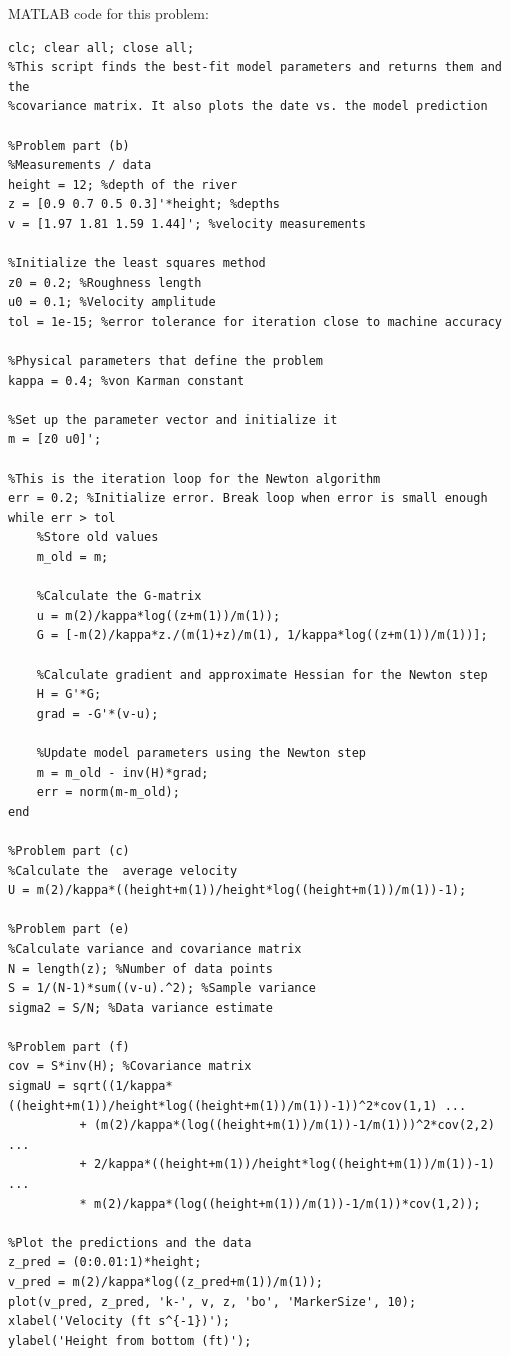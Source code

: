 \documentclass[11pt]{article}
\begin{document}
\vspace{1cm}
\noindent MATLAB code for this problem:
\begin{verbatim}
clc; clear all; close all;
%This script finds the best-fit model parameters and returns them and the
%covariance matrix. It also plots the date vs. the model prediction

%Problem part (b)
%Measurements / data
height = 12; %depth of the river
z = [0.9 0.7 0.5 0.3]'*height; %depths
v = [1.97 1.81 1.59 1.44]'; %velocity measurements

%Initialize the least squares method
z0 = 0.2; %Roughness length
u0 = 0.1; %Velocity amplitude
tol = 1e-15; %error tolerance for iteration close to machine accuracy

%Physical parameters that define the problem
kappa = 0.4; %von Karman constant

%Set up the parameter vector and initialize it
m = [z0 u0]';

%This is the iteration loop for the Newton algorithm
err = 0.2; %Initialize error. Break loop when error is small enough
while err > tol
    %Store old values
    m_old = m;
    
    %Calculate the G-matrix
    u = m(2)/kappa*log((z+m(1))/m(1));
    G = [-m(2)/kappa*z./(m(1)+z)/m(1), 1/kappa*log((z+m(1))/m(1))];
        
    %Calculate gradient and approximate Hessian for the Newton step
    H = G'*G;
    grad = -G'*(v-u);
    
    %Update model parameters using the Newton step
    m = m_old - inv(H)*grad;
    err = norm(m-m_old);
end

%Problem part (c)
%Calculate the  average velocity
U = m(2)/kappa*((height+m(1))/height*log((height+m(1))/m(1))-1);

%Problem part (e)
%Calculate variance and covariance matrix
N = length(z); %Number of data points
S = 1/(N-1)*sum((v-u).^2); %Sample variance
sigma2 = S/N; %Data variance estimate

%Problem part (f)
cov = S*inv(H); %Covariance matrix
sigmaU = sqrt((1/kappa*((height+m(1))/height*log((height+m(1))/m(1))-1))^2*cov(1,1) ...
          + (m(2)/kappa*(log((height+m(1))/m(1))-1/m(1)))^2*cov(2,2) ...
          + 2/kappa*((height+m(1))/height*log((height+m(1))/m(1))-1) ...
          * m(2)/kappa*(log((height+m(1))/m(1))-1/m(1))*cov(1,2));          

%Plot the predictions and the data
z_pred = (0:0.01:1)*height;
v_pred = m(2)/kappa*log((z_pred+m(1))/m(1));
plot(v_pred, z_pred, 'k-', v, z, 'bo', 'MarkerSize', 10);
xlabel('Velocity (ft s^{-1})');
ylabel('Height from bottom (ft)');
\end{verbatim}
\end{document}
